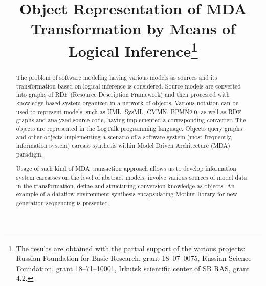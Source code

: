 \documentclass[conference]{IEEEtran}
\begin{document}
\title{Object Representation of MDA Transformation by Means of Logical Inference\thanks{The results are obtained with the partial support of the various projects: Russian Foundation for Basic Research, grant 18--07--0075,
Russian Science Foundation, grant 18--71--10001,
Irkutsk scientific center of SB RAS, grant 4.2.}}


\author{
}




\maketitle

\begin{abstract} %
  The problem of software modeling having various models as sources and its transformation based on logical inference is considered.  Source models are converted into graphs of RDF (Resource Description Framework) and then processed with knowledge based system organized in a network of objects.  Various notation can be used to represent models, such as UML, SysML, CMMN, BPMN2.0, as well as RDF graphs and analyzed source code, having implemented a corresponding converter.  The objects are represented in the LogTalk programming language.  Objects query graphs and other objects implementing a scenario of a software system (most frequently, information system) carcass synthesis within Model Driven Architecture (MDA) paradigm.

  Usage of such kind of MDA transaction approach allows us to develop information system carcasses on the level of abstract models, involve various sources of model data in the transformation, define and structuring conversion knowledge as objects.  An example of a dataflow environment synthesis encapsulating Mothur library for new generation sequencing is presented.
\end{abstract}
\end{document}
